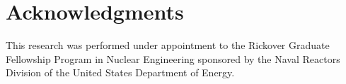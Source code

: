 \documentclass[preprint,10pt]{elsarticle}
\begin{document}
\section*{Acknowledgments} 
This research was performed under appointment to the Rickover Graduate Fellowship Program in Nuclear Engineering sponsored by the Naval Reactors Division of the United States Department of Energy.



\end{document}
